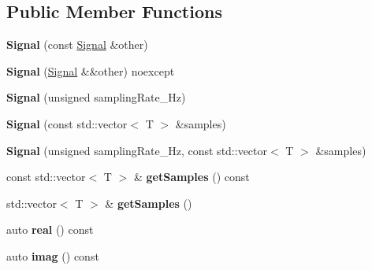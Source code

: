 \subsection*{Public Member Functions}
\begin{DoxyCompactItemize}
\item 
\mbox{\label{classdsp_1_1_signal_a11921403012b1f6d3646b545306365c5}} 
{\bfseries Signal} (const \mbox{\hyperlink{classdsp_1_1_signal}{Signal}} \&other)
\item 
\mbox{\label{classdsp_1_1_signal_a74deecb216de7c0374d9ef3c131cf567}} 
{\bfseries Signal} (\mbox{\hyperlink{classdsp_1_1_signal}{Signal}} \&\&other) noexcept
\item 
\mbox{\label{classdsp_1_1_signal_a2d5bf6d7fa0d6ba44be9eecfb46df73c}} 
{\bfseries Signal} (unsigned sampling\+Rate\+\_\+\+Hz)
\item 
\mbox{\label{classdsp_1_1_signal_a8ab4d6515bd23ec01a2d9a605fea2d8a}} 
{\bfseries Signal} (const std\+::vector$<$ T $>$ \&samples)
\item 
\mbox{\label{classdsp_1_1_signal_af389bdad6c03f8be93e26434f24502e3}} 
{\bfseries Signal} (unsigned sampling\+Rate\+\_\+\+Hz, const std\+::vector$<$ T $>$ \&samples)
\item 
\mbox{\label{classdsp_1_1_signal_ad73e5d0efc33884529055539130db799}} 
const std\+::vector$<$ T $>$ \& {\bfseries get\+Samples} () const
\item 
\mbox{\label{classdsp_1_1_signal_a114bfee2813c115c0685e9067f4a0cc5}} 
std\+::vector$<$ T $>$ \& {\bfseries get\+Samples} ()
\item 
\mbox{\label{classdsp_1_1_signal_a6a1343f010f761d42b84962f8fc4c808}} 
auto {\bfseries real} () const
\item 
\mbox{\label{classdsp_1_1_signal_a8feb196987344db970173674d9b5fb27}} 
auto {\bfseries imag} () const
\item 
\mbox{\label{classdsp_1_1_signal_ad8d823b6a6991222336becec777e9b09}} 

\end{DoxyCompactItemize}
